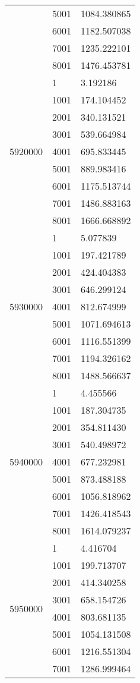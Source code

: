 \begin{table}[htb!]
\begin{tabular}{lll}
 & 5001 & 1084.380865 \\
 & 6001 & 1182.507038 \\
 & 7001 & 1235.222101 \\
 & 8001 & 1476.453781 \\
\multirow[c]{9}{*}{5920000} & 1 & 3.192186 \\
 & 1001 & 174.104452 \\
 & 2001 & 340.131521 \\
 & 3001 & 539.664984 \\
 & 4001 & 695.833445 \\
 & 5001 & 889.983416 \\
 & 6001 & 1175.513744 \\
 & 7001 & 1486.883163 \\
 & 8001 & 1666.668892 \\
\multirow[c]{9}{*}{5930000} & 1 & 5.077839 \\
 & 1001 & 197.421789 \\
 & 2001 & 424.404383 \\
 & 3001 & 646.299124 \\
 & 4001 & 812.674999 \\
 & 5001 & 1071.694613 \\
 & 6001 & 1116.551399 \\
 & 7001 & 1194.326162 \\
 & 8001 & 1488.566637 \\
\multirow[c]{9}{*}{5940000} & 1 & 4.455566 \\
 & 1001 & 187.304735 \\
 & 2001 & 354.811430 \\
 & 3001 & 540.498972 \\
 & 4001 & 677.232981 \\
 & 5001 & 873.488188 \\
 & 6001 & 1056.818962 \\
 & 7001 & 1426.418543 \\
 & 8001 & 1614.079237 \\
\multirow[c]{9}{*}{5950000} & 1 & 4.416704 \\
 & 1001 & 199.713707 \\
 & 2001 & 414.340258 \\
 & 3001 & 658.154726 \\
 & 4001 & 803.681135 \\
 & 5001 & 1054.131508 \\
 & 6001 & 1216.551304 \\
 & 7001 & 1286.999464 \\

\end{tabular}
\end{table}
